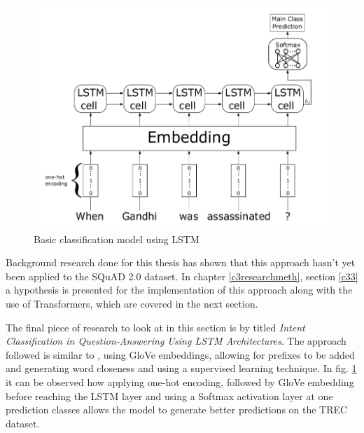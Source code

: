 \documentclass[a4paper,12pt]{report}
\begin{document}
		\begin{figure}[!h]
			\centering
			\includegraphics[scale=0.35]{../images/lstm-intent1.png}
			\caption{Basic classification model using LSTM \citep{lstmintent}}\label{lstmIntent1}
		\end{figure}

	     Background research done for this thesis has shown that this approach hasn't yet been applied to the SQuAD 2.0 dataset. In chapter \ref{c3researchmeth}, section \ref{c33} a hypothesis is presented for the implementation of this approach along with the use of Transformers, which are covered in the next section.

         The final piece of research to look at in this section is by \citep{lstmintent} titled \textit{Intent Classification in Question-Answering Using LSTM Architectures}. The approach followed is similar to \citep{lstmSubilstm}, using GloVe embeddings, allowing for prefixes to be added and generating word closeness and using a supervised learning technique. In fig. \ref{lstmIntent1} it can be observed how applying one-hot encoding, followed by GloVe embedding before reaching the LSTM layer and using a Softmax activation layer at one prediction classes allows the model to generate better predictions on the TREC \citep{trec} dataset.
\end{document}
